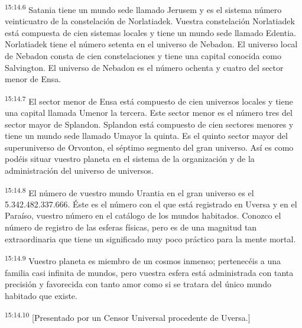 \par
\textsuperscript{15:14.6} Satania tiene un mundo sede llamado Jerusem y es el sistema número veinticuatro de la constelación de Norlatiadek. Vuestra constelación Norlatiadek está compuesta de cien sistemas locales y tiene un mundo sede llamado Edentia. Norlatiadek tiene el número setenta en el universo de Nebadon. El universo local de Nebadon consta de cien constelaciones y tiene una capital conocida como Salvington. El universo de Nebadon es el número ochenta y cuatro del sector menor de Ensa.

\par
\textsuperscript{15:14.7} El sector menor de Ensa está compuesto de cien universos locales y tiene una capital llamada Umenor la tercera. Este sector menor es el número tres del sector mayor de Splandon. Splandon está compuesto de cien sectores menores y tiene un mundo sede llamado Umayor la quinta. Es el quinto sector mayor del superuniverso de Orvonton, el séptimo segmento del gran universo. Así es como podéis situar vuestro planeta en el sistema de la organización y de la administración del universo de universos.

\par
\textsuperscript{15:14.8} El número de vuestro mundo Urantia en el gran universo es el 5.342.482.337.666. Éste es el número con el que está registrado en Uversa y en el Paraíso, vuestro número en el catálogo de los mundos habitados. Conozco el número de registro de las esferas físicas, pero es de una magnitud tan extraordinaria que tiene un significado muy poco práctico para la mente mortal.

\par
\textsuperscript{15:14.9} Vuestro planeta es miembro de un cosmos inmenso; pertenecéis a una familia casi infinita de mundos, pero vuestra esfera está administrada con tanta precisión y favorecida con tanto amor como si se tratara del único mundo habitado que existe.

\par
\textsuperscript{15:14.10} [Presentado por un Censor Universal procedente de Uversa.]